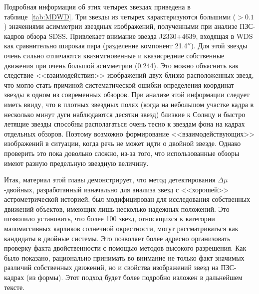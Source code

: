 Подробная информация об этих четырех звездах приведена в таблице~\ref{tab:MDWD}. Три звезды из четырех характеризуются большими ($>0.1$) значениями асимметрии звездных изображений, полученными при анализе ПЗС-кадров обзора SDSS. Привлекает внимание звезда J2330+4639, входящая в WDS как сравнительно широкая пара (разделение компонент 21.4$''$). Для этой звезды очень сильно отличаются квазимгновенные и квазисредние собственные движения при очень большой асимметрии (0.244). Это можно объяснить как следствие <<взаимодействия>> изображений двух близко расположенных звезд, что могло стать причиной систематической ошибки определения координат звезды в одном из современных обзоров. При анализе этой информации следует иметь ввиду, что в плотных звездных полях (когда на небольшом участке кадра в несколько минут дуги наблюдаются десятки звезд) близкие к Солнцу и быстро летящие звезды способны располагаться очень тесно к звездам фона на кадрах отдельных обзоров. Поэтому возможно формирование <<взаимодействующих>> изображений в ситуации, когда речь не может идти о двойной звезде. Однако проверить это пока довольно сложно, из-за того, что использованные обзоры имеют разную предельную звездную величину.

Итак, материал этой главы демонстрирует, что метод детектирования $\Delta\mu$-двойных, разработанный изначально для анализа звезд с <<хорошей>> астрометрической историей, был модифицирован для исследования собственных движений объектов, имеющих лишь несколько надежных положений. Это позволило установить, что более 100 звезд, относящихся к категории маломассивных карликов солнечной окрестности, могут рассматриваться как кандидаты в двойные системы. Это позволяет более адресно организовать проверку факта двойственности с помощью методов высокого разрешения. Как было показано, рационально принимать во внимание не только факт значимых различий собственных движений, но и свойства изображений звезд на ПЗС-кадрах (из формы). Этот подход будет более подробно изложен в дальнейшем тексте.

